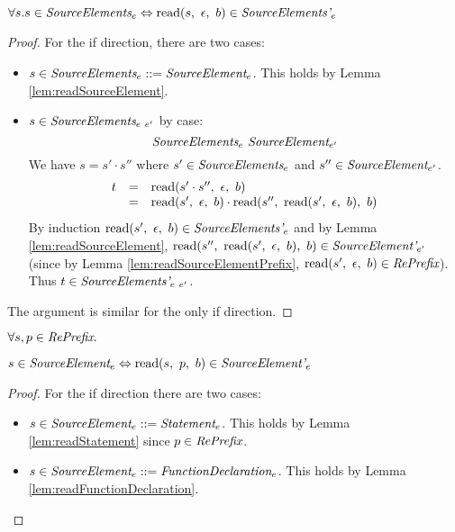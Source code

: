\documentclass[preprint,10pt]{sigplanconf}
\begin{document}
\begin{lemma}\mbox{}

  \( \forall s. s \in \textit{SourceElements}_{e} \Leftrightarrow 
  \textrm{read}(s,~\epsilon,~b) \in \textit{SourceElements'}_{e} \)
\end{lemma}
\begin{proof}
  For the if direction, there are two cases:
  \begin{itemize}
  \item \( s \in \textit{SourceElements}_{e} ::=
    \textit{SourceElement}_{e} \). This holds by Lemma
    \ref{lem:readSourceElement}.
    
  \item \( s \in \textit{SourceElements}_{e~e'} \) by case:
    \[
    \textit{SourceElements}_{e}~\textit{SourceElement}_{e'} 
    \] 
    We have
    \( s = s' \cdot s'' \) where \( s' \in \textit{SourceElements}_{e}
    \) and \( s'' \in \textit{SourceElement}_{e'} \).
    \[
    \begin{array}{rcl}
      t &=& \textrm{read}(s'\cdot s'',~\epsilon,~b)
      \\
      &=& \textrm{read}(s',~\epsilon,~b)\cdot \textrm{read}(s'',~\textrm{read}(s',~\epsilon,~b),~b)
    \end{array}
    \]
    By induction \( \textrm{read}(s',~\epsilon,~b) \in
    \textit{SourceElements'}_{e} \) and by Lemma
    \ref{lem:readSourceElement}, \( \textrm{read}(s'',~
      \textrm{read}(s',~\epsilon,~b),~b) \in \textit{SourceElement'}_{e'} \) (since
    by Lemma \ref{lem:readSourceElementPrefix}, \( 
    \textrm{read}(s',~\epsilon,~b) \in \textit{RePrefix} \)). Thus \( t \in
    \textit{SourceElements'}_{e~e'} \).
  \end{itemize}
  
  The argument is similar for the only if direction.
\end{proof}


\begin{lemma}\mbox{}
  
  \( \forall s, p \in \textit{RePrefix}. \)

  \( s \in \textit{SourceElement}_{e} \Leftrightarrow 
  \textrm{read}(s,~p,~b) \in \textit{SourceElement'}_{e} \)
\end{lemma}
\begin{proof}
  For the if direction there are two cases:
  \begin{itemize}
  \item \( s \in \textit{SourceElement}_{e} ::= \textit{Statement}_{e} \).
    This holds by Lemma \ref{lem:readStatement} since \( p \in \textit{RePrefix} \).
    
  \item \( s \in \textit{SourceElement}_{e} ::=
    \textit{FunctionDeclaration}_{e} \). This holds by Lemma
    \ref{lem:readFunctionDeclaration}.
  \end{itemize}
\end{proof}
\end{document}
